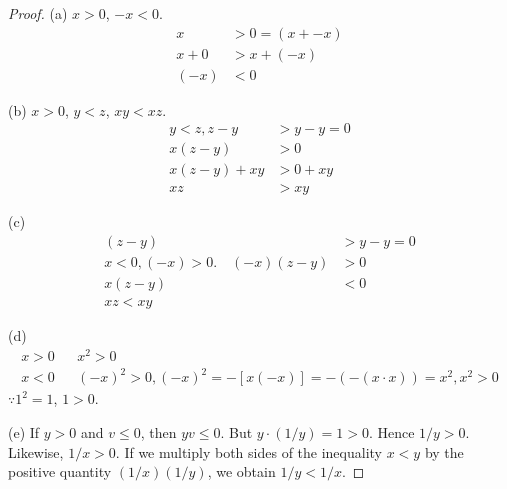 \begin{proof}
    (a) $x>0$, $-x<0$. 
    \begin{align*}
        x   &> 0=(x+-x)\\
        x+0 &> x+(-x)\\
        (-x)&<0
    \end{align*}

    (b) $x>0$, $y<z$, $xy<xz$.
    \begin{align*}
        y<z, z-y&>y-y=0\\
        x(z-y)&>0\\
        x(z-y)+xy&>0+xy\\
        xz&>xy
    \end{align*}

    (c)
    \begin{align*}
        (z-y) &>y-y=0\\
        x<0,(-x)>0.\quad (-x)(z-y)&>0 \\
        x(z-y) &<0\\
        xz<xy    
    \end{align*}

    (d)
    \begin{align*}
        x>0  && x^2    >0  \\
        x<0  &&(-x)^2 >0, (-x)^2 = -[x(-x)] = -(-(x\cdot x)) =x^2, x^2>0
    \end{align*}
    $\because 1^2=1$, $1>0$.

    (e)
    If $y>0$ and $v \leq 0$, then $yv \leq 0$. But $y \cdot (1/y)=1>0$. Hence $1/y > 0$.
    Likewise, $1/x > 0$. If we multiply both sides of the inequality $x <y$ by
    the positive quantity $(1/x)(1/y)$, we obtain $1/y <1/x$.
\end{proof}

